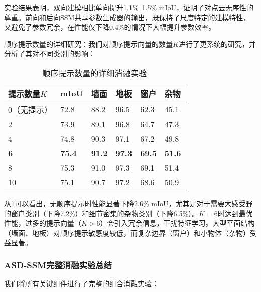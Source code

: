 \documentclass[preprint,12pt]{elsarticle}
\begin{document}
实验结果表明，双向建模相比单向提升1.1\%~1.5\% mIoU，证明了对点云无序性的尊重。前向和后向SSM共享参数生成器的输出，既保持了尺度特定的建模特性，又避免了参数冗余，在性能仅下降0.4\%的情况下大幅提升参数效率。

顺序提示数量的详细研究：我们对顺序提示向量的数量$K$进行了更系统的研究，并分析了其对不同类别的影响：

\begin{table}[htbp!]
	\centering
	\caption{顺序提示数量的详细消融实验}
	\label{tab:order_prompt_detail}
	\begin{tabular}{@{}llllll@{}}
		\toprule
		提示数量$K$ & mIoU & 墙面 & 地板 & 窗户 & 杂物 \\ 
		\midrule
		0（无提示） & 72.8 & 88.2 & 96.5 & 62.3 & 45.1 \\
		2 & 73.9 & 89.1 & 96.8 & 64.7 & 47.3 \\
		4 & 74.8 & 90.3 & 97.1 & 67.2 & 49.8 \\
		\textbf{6} & \textbf{75.4} & \textbf{91.2} & \textbf{97.3} & \textbf{69.5} & \textbf{51.6} \\
		8 & 75.3 & 91.0 & 97.3 & 69.1 & 51.4 \\
		10 & 75.1 & 90.7 & 97.2 & 68.6 & 50.9 \\
		\bottomrule
	\end{tabular}
\end{table}

从\cref{tab:order_prompt_detail}可以看出，无顺序提示时性能显著下降2.6\% mIoU，尤其是对于需要大感受野的窗户类别（下降7.2\%）和细节密集的杂物类别（下降6.5\%）。$K=6$时达到最优性能，过多的提示向量（$K>6$）会引入冗余信息，干扰特征学习。大型平面结构（墙面、地板）对顺序提示敏感度较低，而复杂边界（窗户）和小物体（杂物）受益显著。


\subsubsection{ASD-SSM完整消融实验总结}
我们将所有关键组件进行了完整的组合消融实验：
\end{document}
